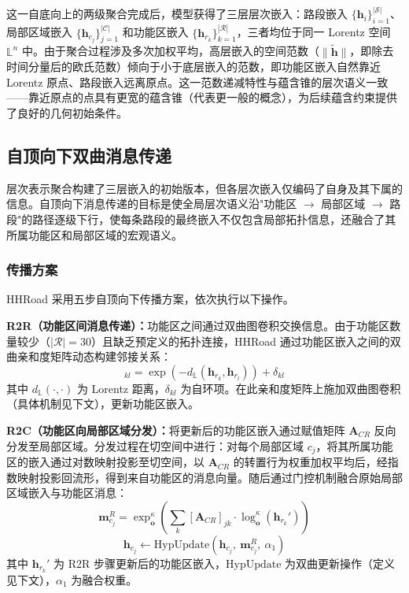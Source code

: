这一自底向上的两级聚合完成后，模型获得了三层层次嵌入：路段嵌入 $\{\mathbf{h}_i\}_{i=1}^{|\mathcal{S}|}$、局部区域嵌入 $\{\mathbf{h}_{c_j}\}_{j=1}^{|\mathcal{C}|}$ 和功能区嵌入 $\{\mathbf{h}_{r_k}\}_{k=1}^{|\mathcal{R}|}$，三者均位于同一 Lorentz 空间 $\mathbb{L}^n$ 中。由于聚合过程涉及多次加权平均，高层嵌入的空间范数（$\|\tilde{\mathbf{h}}\|$，即除去时间分量后的欧氏范数）倾向于小于底层嵌入的范数，即功能区嵌入自然靠近 Lorentz 原点、路段嵌入远离原点。这一范数递减特性与蕴含锥的层次语义一致——靠近原点的点具有更宽的蕴含锥（代表更一般的概念），为后续蕴含约束提供了良好的几何初始条件。

\subsection{自顶向下双曲消息传递}
\label{sec:message_passing}

层次表示聚合构建了三层嵌入的初始版本，但各层次嵌入仅编码了自身及其下属的信息。自顶向下消息传递的目标是使全局层次语义沿"功能区 $\to$ 局部区域 $\to$ 路段"的路径逐级下行，使每条路段的最终嵌入不仅包含局部拓扑信息，还融合了其所属功能区和局部区域的宏观语义。

\subsubsection{传播方案}

HHRoad 采用五步自顶向下传播方案，依次执行以下操作。

\textbf{R2R（功能区间消息传递）：}功能区之间通过双曲图卷积交换信息。由于功能区数量较少（$|\mathcal{R}|=30$）且缺乏预定义的拓扑连接，HHRoad 通过功能区嵌入之间的双曲亲和度矩阵动态构建邻接关系：
\begin{equation}
    [\mathbf{W}_R]_{kl} = \exp\left(-d_{\mathbb{L}}(\mathbf{h}_{r_k}, \mathbf{h}_{r_l})\right) + \delta_{kl}
\end{equation}
其中 $d_{\mathbb{L}}(\cdot, \cdot)$ 为 Lorentz 距离，$\delta_{kl}$ 为自环项。在此亲和度矩阵上施加双曲图卷积（具体机制见下文），更新功能区嵌入。

\textbf{R2C（功能区向局部区域分发）：}将更新后的功能区嵌入通过赋值矩阵 $\mathbf{A}_{CR}$ 反向分发至局部区域。分发过程在切空间中进行：对每个局部区域 $c_j$，将其所属功能区的嵌入通过对数映射投影至切空间，以 $\mathbf{A}_{CR}$ 的转置行为权重加权平均后，经指数映射投影回流形，得到来自功能区的消息向量。随后通过门控机制融合原始局部区域嵌入与功能区消息：
\begin{equation}
    \mathbf{m}_{c_j}^{R} = \exp_{\mathbf{o}}^\kappa\left(\sum_{k} [\mathbf{A}_{CR}]_{jk} \cdot \log_{\mathbf{o}}^\kappa(\mathbf{h}_{r_k}')\right)
\end{equation}
\begin{equation}
    \mathbf{h}_{c_j} \leftarrow \text{HypUpdate}(\mathbf{h}_{c_j},\ \mathbf{m}_{c_j}^{R},\ \alpha_1)
\end{equation}
其中 $\mathbf{h}_{r_k}'$ 为 R2R 步骤更新后的功能区嵌入，$\text{HypUpdate}$ 为双曲更新操作（定义见下文），$\alpha_1$ 为融合权重。

